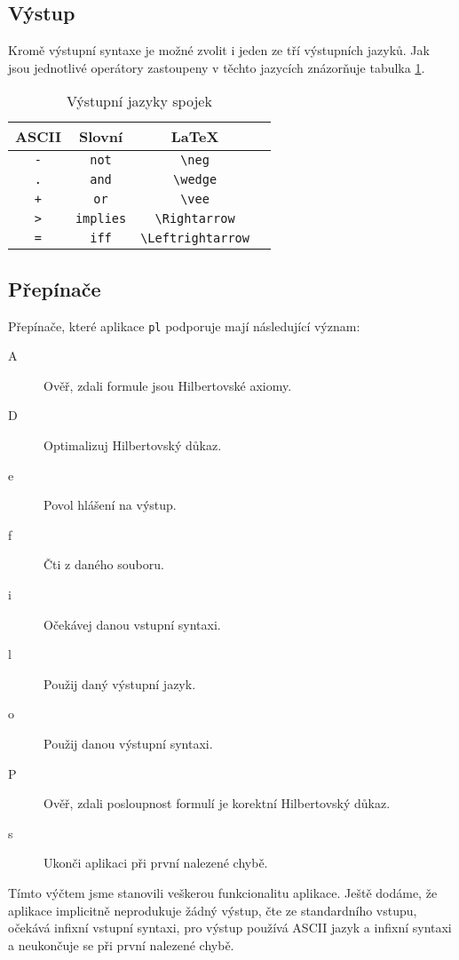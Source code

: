\documentclass[thesis=B,czech,hidelinks]{FITthesis}[2012/06/26]
\begin{document}
\subsection{Výstup}

Kromě výstupní syntaxe je možné zvolit i jeden ze tří výstupních jazyků. Jak jsou jednotlivé operátory zastoupeny v těchto jazycích znázorňuje tabulka \ref{tab:spojky}.

\begin{table}
\centering
\caption{Výstupní jazyky spojek}
\label{tab:spojky}
\begin{tabular}{|c|c|c|c|}\hline
	ASCII & Slovní & \LaTeX \tabularnewline \hline \hline
	\verb|-| & \verb|not| & \verb|\neg| \tabularnewline \hline
	\verb|.| & \verb|and| & \verb|\wedge| \tabularnewline \hline
	\verb|+| & \verb|or| & \verb|\vee| \tabularnewline \hline
	\verb|>| & \verb|implies| & \verb|\Rightarrow| \tabularnewline \hline
	\verb|=| & \verb|iff| & \verb|\Leftrightarrow| \tabularnewline \hline
\end{tabular}
\end{table}

\subsection{Přepínače}

Přepínače, které aplikace \texttt{pl} podporuje mají následující význam:

\begin{description}
	\item[A] Ověř, zdali formule jsou Hilbertovské axiomy.
	\item[D] Optimalizuj Hilbertovský důkaz.
	\item[e] Povol hlášení na výstup.
	\item[f] Čti z daného souboru.
	\item[i] Očekávej danou vstupní syntaxi.
	\item[l] Použij daný výstupní jazyk.
	\item[o] Použij danou výstupní syntaxi.
	\item[P] Ověř, zdali posloupnost formulí je korektní Hilbertovský důkaz.
	\item[s] Ukonči aplikaci při první nalezené chybě.
\end{description}

Tímto výčtem jsme stanovili veškerou funkcionalitu aplikace. Ještě dodáme, že aplikace implicitně neprodukuje žádný výstup, čte ze standardního vstupu, očekává infixní vstupní syntaxi, pro výstup používá ASCII jazyk a infixní syntaxi a neukončuje se při první nalezené chybě.
\end{document}
